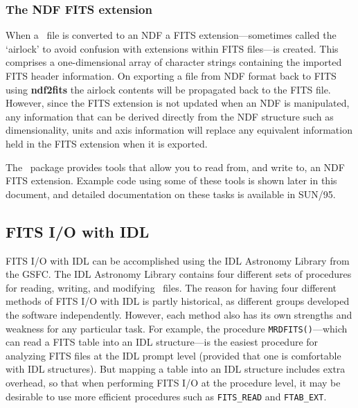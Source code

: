 \documentclass[twoside,11pt]{article}
\newcommand{\htmladdnormallink}[2]{#1}
\newcommand{\htmlref}[2]{#1}
\newcommand{\xref}[3]{#1}
\newcommand{\xlabel}[1]{}
\begin{document}
\begin{\htmlonly}
\subsubsection{The NDF FITS extension}

When a \FITSref\ file is converted to an \xref{NDF}{sun33}{} a FITS
extension---sometimes called the `airlock' to avoid confusion with
extensions within FITS files---is created.  This comprises a
one-dimensional array of character strings containing the imported
FITS header information.  On exporting a file from NDF format back to
FITS using \xref{{\bf ndf2fits}}{sun55}{NDF2FITS} the airlock contents
will be propagated back to the FITS file.  However, since the FITS
extension is not updated when an NDF is manipulated, any information
that can be derived directly from the NDF structure such as
dimensionality, units and axis information will replace any equivalent
information held in the FITS extension when it is exported.

The \KAPPAref\ package provides tools that allow you to read from, and
write to, an NDF FITS extension.  Example code using some of these
tools is shown later in this
\htmlref{document}{sc16_fitsheader}, and detailed documentation on these
tasks is available in \xref{SUN/95}{sun95}{se_fitsairlock}.

\subsection{\xlabel{sc16_fitsidl}FITS I/O with IDL\label{sc16_fitsidl}}

\htmladdnormallink{FITS
I/O}{http://idlastro.gsfc.nasa.gov/fitsio.html} with IDL can be
accomplished using the \htmladdnormallink{IDL Astronomy
Library}{http://idlastro.gsfc.nasa.gov/homepage.html} from the GSFC.
The IDL Astronomy Library contains four different sets of procedures
for reading, writing, and modifying \FITSref\ files.  The reason for having
four different methods of FITS I/O with IDL is partly historical, as
different groups developed the software independently.  However, each
method also has its own strengths and weakness for any particular
task.  For example, the procedure {\tt MRDFITS()}---which can read a
FITS table into an IDL structure---is the easiest procedure for
analyzing FITS files at the IDL prompt level (provided that one is
comfortable with IDL structures).  But mapping a table into an IDL
structure includes extra overhead, so that when performing FITS I/O at
the procedure level, it may be desirable to use more efficient
procedures such as {\tt FITS\_READ} and {\tt FTAB\_EXT}.


\end{\htmlonly}
\end{document}

